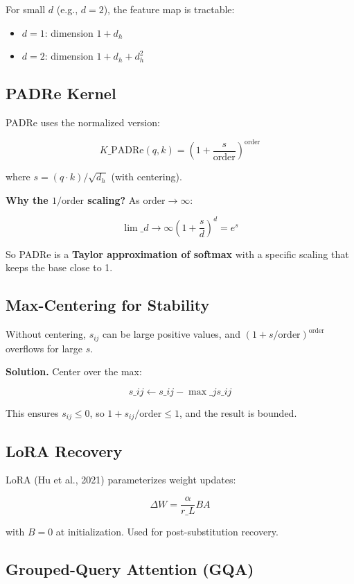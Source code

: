 For small $d$ (e.g., $d = 2$), the feature map is tractable:
\begin{itemize}
\item $d = 1$: dimension $1 + d_h$
\item $d = 2$: dimension $1 + d_h + d_h^2$

\end{itemize}
\subsection{PADRe Kernel}

PADRe uses the normalized version:

\[
K\_\text{PADRe}(q, k) = \left(1 + \frac{s}{\text{order}}\right)^\text{order}
\tag{3.7}
\]

where $s = (q \cdot k)/\sqrt{d_h}$ (with centering).

\textbf{Why the $1/\text{order}$ scaling?} As $\text{order} \to \infty$:

\[
\lim\_{d \to \infty} \left(1 + \frac{s}{d}\right)^d = e^s
\tag{3.8}
\]

So PADRe is a \textbf{Taylor approximation of softmax} with a specific 
scaling that keeps the base close to 1.

\subsection{Max-Centering for Stability}

Without centering, $s_{ij}$ can be large positive values, and 
$(1 + s/\text{order})^\text{order}$ overflows for large $s$.

\textbf{Solution.} Center over the max:

\[
s\_{ij} \leftarrow s\_{ij} - \max\_j s\_{ij}
\tag{3.9}
\]

This ensures $s_{ij} \leq 0$, so $1 + s_{ij}/\text{order} \leq 1$, and 
the result is bounded.

\subsection{LoRA Recovery}

LoRA (Hu et al., 2021) parameterizes weight updates:

\[
\Delta W = \frac{\alpha}{r\_L} B A
\tag{3.10}
\]

with $B = 0$ at initialization. Used for post-substitution recovery.

\subsection{Grouped-Query Attention (GQA)}

